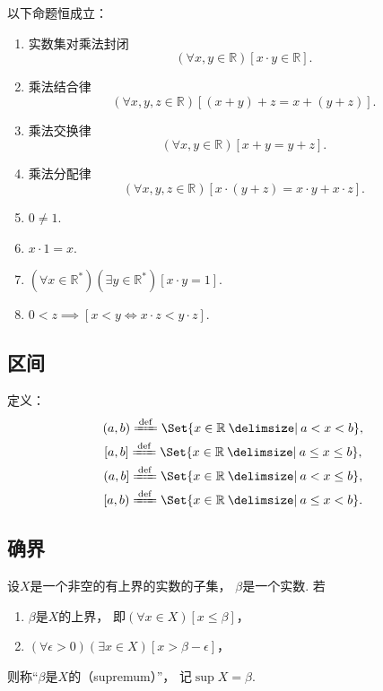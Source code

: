\begin{theorem}
以下命题恒成立：
\begin{enumerate}
	\item 实数集对乘法封闭\begin{equation}
		(\forall x,y\in\mathbb{R})[x \cdot y \in \mathbb{R}].
	\end{equation}
	\item 乘法结合律\begin{equation}
		(\forall x,y,z\in\mathbb{R})[(x+y)+z=x+(y+z)].
	\end{equation}
	\item 乘法交换律\begin{equation}
		(\forall x,y\in\mathbb{R})[x+y=y+z].
	\end{equation}
	\item 乘法分配律\begin{equation}
		(\forall x,y,z\in\mathbb{R})[x\cdot(y+z)=x \cdot y+x \cdot z].
	\end{equation}
	\item \(0\neq1\).
	\item \(x\cdot1=x\).
	\item \((\forall x\in\mathbb{R}^*)(\exists y\in\mathbb{R}^*)[x \cdot y=1]\).
	\item \(0<z \implies [x<y \iff x \cdot z<y \cdot z]\).
\end{enumerate}
\end{theorem}

\subsection{区间}
定义：\begin{gather}
	(a,b) \defeq \Set{ x\in\mathbb{R} \given a<x<b }, \\
	[a,b] \defeq \Set{ x\in\mathbb{R} \given a \leq x \leq b }, \\
	(a,b] \defeq \Set{ x\in\mathbb{R} \given a < x \leq b }, \\
	[a,b) \defeq \Set{ x\in\mathbb{R} \given a \leq x < b }.
\end{gather}

\subsection{确界}
\begin{definition}
设\(X\)是一个非空的有上界的实数的子集，
\(\beta\)是一个实数.
若\begin{enumerate}
	\item \(\beta\)是\(X\)的上界，
	即\((\forall x \in X)[x \leq \beta]\)，

	\item \((\forall \epsilon>0)(\exists x \in X)[x>\beta-\epsilon]\)，
\end{enumerate}
则称“\(\beta\)是\(X\)的（supremum）”，
记\(\sup X = \beta\).
\end{definition}

